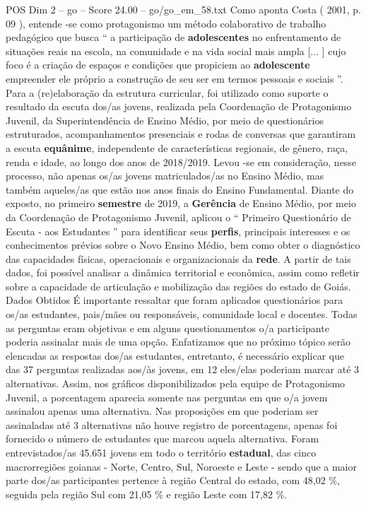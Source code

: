 \begin{textsample}{POS Dim 2 – go – Score 24.00 – go/go\_em\_58.txt}
Como aponta Costa ( 2001, p. 09 ), entende -se como protagonismo um método colaborativo de trabalho pedagógico que busca “ a participação de \textbf{adolescentes} no enfrentamento de situações reais na escola, na comunidade e na vida social mais ampla [... ] cujo foco é a criação de espaços e condições que propiciem ao \textbf{adolescente} empreender ele próprio a construção de seu ser em termos pessoais e sociais ”.
Para a (re)elaboração da estrutura curricular, foi utilizado como suporte o resultado da escuta dos/as jovens, realizada pela Coordenação de Protagonismo Juvenil, da Superintendência de Ensino Médio, por meio de questionários estruturados, acompanhamentos presenciais e rodas de conversas que garantiram a escuta \textbf{equânime}, independente de características regionais, de gênero, raça, renda e idade, ao longo dos anos de 2018/2019.
Levou -se em consideração, nesse processo, não apenas os/as jovens matriculados/as no Ensino Médio, mas também aqueles/as que estão nos anos finais do Ensino Fundamental.
Diante do exposto, no primeiro \textbf{semestre} de 2019, a \textbf{Gerência} de Ensino Médio, por meio da Coordenação de Protagonismo Juvenil, aplicou o “ Primeiro Questionário de Escuta - aos Estudantes ” para identificar seus \textbf{perfis}, principais interesses e os conhecimentos prévios sobre o Novo Ensino Médio, bem como obter o diagnóstico das capacidades físicas, operacionais e organizacionais da \textbf{rede}.
A partir de tais dados, foi possível analisar a dinâmica territorial e econômica, assim como refletir sobre a capacidade de articulação e mobilização das regiões do estado de Goiás.
Dados Obtidos É importante ressaltar que foram aplicados questionários para os/as estudantes, pais/mães ou responsáveis, comunidade local e docentes.
Todas as perguntas eram objetivas e em alguns questionamentos o/a participante poderia assinalar mais de uma opção.
Enfatizamos que no próximo tópico serão elencadas as respostas dos/as estudantes, entretanto, é necessário explicar que das 37 perguntas realizadas aos/às jovens, em 12 eles/elas poderiam marcar até 3 alternativas.
Assim, nos gráficos disponibilizados pela equipe de Protagonismo Juvenil, a porcentagem aparecia somente nas perguntas em que o/a jovem assinalou apenas uma alternativa.
Nas proposições em que poderiam ser assinaladas até 3 alternativas não houve registro de porcentagens, apenas foi fornecido o número de estudantes que marcou aquela alternativa.
Foram entrevistados/as 45.651 jovens em todo o território \textbf{estadual}, das cinco macrorregiões goianas - Norte, Centro, Sul, Noroeste e Leste - sendo que a maior parte dos/as participantes pertence à região Central do estado, com 48,02 \%, seguida pela região Sul com 21,05 \% e região Leste com 17,82 \%.

\end{textsample}
